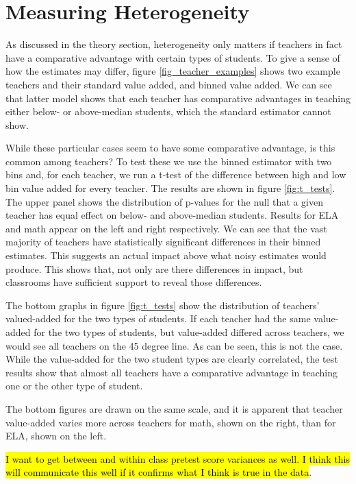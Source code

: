 \documentclass[12pt]{article}
\theoremstyle{definition}
\theoremstyle{definition}
\theoremstyle{definition}
\theoremstyle{definition}
\begin{document}
\section{Measuring Heterogeneity} \label{hetva}

    As discussed in the theory section, heterogeneity only matters if teachers in fact have a comparative advantage with certain types of students. To give a sense of how the estimates may differ, figure \ref{fig_teacher_examples}  shows two example teachers and their standard value added, and binned value added. We can see that latter model shows that each teacher has comparative advantages in teaching either below- or above-median students, which the standard estimator cannot show. 
    
    While these particular cases seem to have some comparative advantage, is this common among teachers? To test these we use the binned estimator with two bins and, for each teacher, we run a t-test of the difference between high and low bin value added for every teacher. The results are shown in figure \ref{fig:t_tests}. The upper panel shows the distribution of p-values for the null that a given teacher has equal effect on below- and above-median students. Results for ELA and math appear on the left and right respectively. We can see that the vast majority of teachers have statistically significant differences in their binned estimates. This suggests an actual impact above what noisy estimates would produce. This shows that, not only are there differences in impact, but classrooms have sufficient support to reveal those differences. 
    
    The bottom graphs in figure \ref{fig:t_tests} show the distribution of teachers' valued-added for the two types of students. If each teacher had the same value-added for the two types of students, but value-added differed across teachers, we would see all teachers on the 45 degree line.  As can be seen, this is not the case. While the value-added for the two student types are clearly correlated, the test results show that almost all teachers have a comparative advantage in teaching one or the other type of student.  

    The bottom figures are drawn on the same scale, and it is apparent that teacher value-added varies more across teachers for math, shown on the right, than for ELA, shown on the left.  
    
    \hl{I want to get between and within class pretest score variances as well. I think this will communicate this well if it confirms what I think is true in the data}. 
\end{document}
